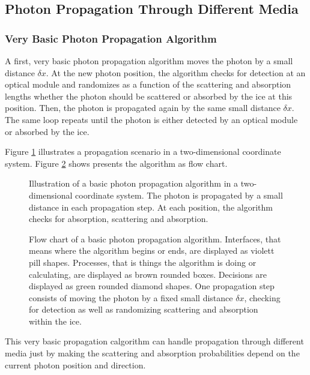 
\subsection{Photon Propagation Through Different Media}

\subsubsection{Very Basic Photon Propagation Algorithm}

A first, very basic photon propagation algorithm moves the photon by a small distance $\delta x$. At the new photon position, the algorithm checks for detection at an optical module and randomizes as a function of the scattering and absorption lengths whether the photon should be scattered or absorbed by the ice at this position. Then, the photon is propagated again by the same small distance $\delta x$. The same loop repeats until the photon is either detected by an optical module or absorbed by the ice.

Figure \ref{fig:ieph6Bie} illustrates a propagation scenario in a two-dimensional coordinate system. Figure \ref{fig:ohsa0miG} shows presents the algorithm as flow chart.

\begin{figure}[htb]
  \label{fig:ieph6Bie}
  \caption{Illustration of a basic photon propagation algorithm in a two-dimensional coordinate system. The photon is propagated by a small distance in each propagation step. At each position, the algorithm checks for absorption, scattering and absorption.}
\end{figure}

\begin{figure}[htb]
  \label{fig:ohsa0miG}
  \caption{Flow chart of a basic photon propagation algorithm. Interfaces, that means where the algorithm begins or ends, are displayed as violett pill shapes. Processes, that is things the algorithm is doing or calculating, are displayed as brown rounded boxes. Decisions are displayed as green rounded diamond shapes. One propagation step consists of moving the photon by a fixed small distance $\delta x$, checking for detection as well as randomizing scattering and absorption within the ice.}
\end{figure}

\FloatBarrier

This very basic propagation calgorithm can handle propagation through different media just by making the scattering and absorption probabilities depend on the current photon position and direction.

